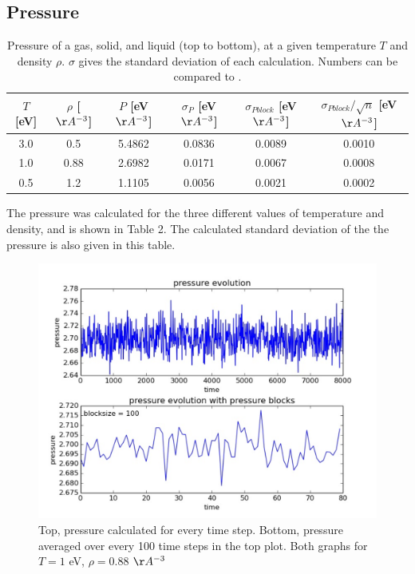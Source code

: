 \documentclass{article}
\begin{document}
\begin{multicols}{2}
\subsection{Pressure}

\begin{table}
\begin{center}
\begin{tabular}{| c | c | c | c | c | c |}
\hline  $T$ [eV] & $\rho$ [$\AA ^{-3}$] & $P$ [eV$\AA ^{-3}$] & $\sigma_{P}$ [eV$\AA ^{-3}$]  & $\sigma_{Pblock}$ [eV$\AA ^{-3}$] & $\sigma_{Pblock}/ \sqrt n$ [eV$\AA ^{-3}$] \\ \hline
  3.0 & 0.5 & 5.4862 & 0.0836 & 0.0089 & 0.0010 \\ \hline
  1.0 & 0.88 & 2.6982 & 0.0171 & 0.0067 & 0.0008 \\ \hline
  0.5 & 1.2 & 1.1105 & 0.0056 & 0.0021 & 0.0002 \\ \hline
\end{tabular}
\label{pressuretab}
\caption{Pressure of a gas, solid, and liquid (top to bottom), at a given temperature $T$ and density $\rho$.  $\sigma$ gives the standard deviation of each calculation. Numbers can be compared to \cite{thijssen}.}
\end{center}
\end{table}

The pressure was calculated for the three different values of temperature and density, and is shown in Table 2.  The calculated standard deviation of the the pressure is also given in this table.  \\


\begin{figure}[H]
\begin{center}
\includegraphics[width=\linewidth]{plots/presn100lp10000T1rho088prt864.pdf}
\caption{Top, pressure calculated for every time step.  Bottom, pressure averaged over every 100 time steps in the top plot. Both graphs for $T = 1$ eV, $\rho = 0.88$ $\AA ^{-3}$}
\label{errex}
\end{center}
\end{figure}


\end{multicols}
\end{document}
